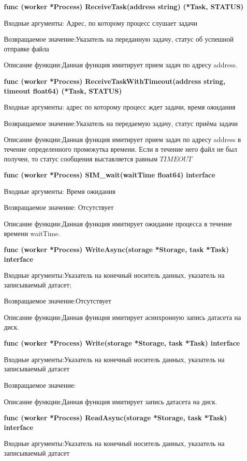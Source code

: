 \textbf{func (worker *Process) ReceiveTask(address string) (*Task, STATUS) }

Входные аргументы: Адрес, по которому процесс слушает задачи

Возвращаемое значение:Указатель на переданную задачу, статус об успешной отправке файла

Описание функции:Данная функция имитирует прием задач по адресу address.

\textbf{func (worker *Process) ReceiveTaskWithTimeout(address string, timeout float64) (*Task, STATUS) }

Входные аргументы: адрес по которому процесс ждет задачи, время ожидания

Возвращаемое значение:Указатель на передаемую задачу, статус приёма задачи

Описание функции:Данная функция имитирует прием задач по адресу address в течение определенного промежутка времени. Если в течение него файл не был получен, то статус сообщения выставляется равным $TIMEOUT$ 

\textbf{func (worker *Process) SIM\_wait(waitTime float64) interface}

Входные аргументы: Время ожидания

Возвращаемое значение: Отсутствует

Описание функции:Данная функция имитирует ожидание процесса в течение времени waitTime. 

\textbf{func (worker *Process) WriteAsync(storage *Storage, task *Task) interface}

Входные аргументы:Указатель на конечный носитель данных, указатель на записываемый датасет;

Возвращаемое значение:Отсутствует

Описание функции:Данная функция имитирует асинхронную запись датасета на диск.

\textbf{func (worker *Process) Write(storage *Storage, task *Task) interface}

Входные аргументы:Указатель на конечный носитель данных, указатель на записываемый датасет

Возвращаемое значение:

Описание функции:Данная функция имитирует запись датасета на диск.

\textbf{func (worker *Process) ReadAsync(storage *Storage, task *Task) interface}

Входные аргументы:Указатель на конечный носитель данных, указатель на записываемый датасет

